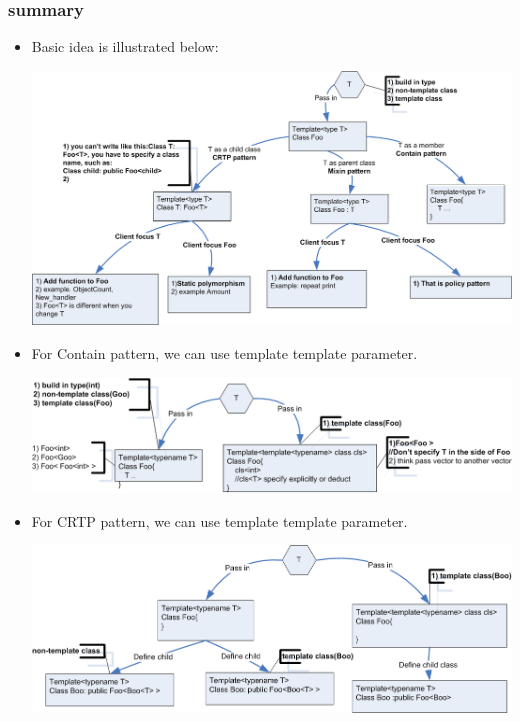 \documentclass[a4paper,11pt,twoside]{book}
\begin{document}
\subsubsection{summary}
\begin{itemize}
	\item Basic idea is illustrated below:

		\includegraphics[width=0.9\linewidth]{pics/mixin.png}

	
	\item For Contain pattern, we can use template template parameter.

		\includegraphics[width=0.9\linewidth]{pics/mixin_tt.png}

	
	\item For CRTP pattern, we can use template template parameter.

		\includegraphics[width=0.9\linewidth]{pics/crtp_tt.png}

\end{itemize}
\end{document}
